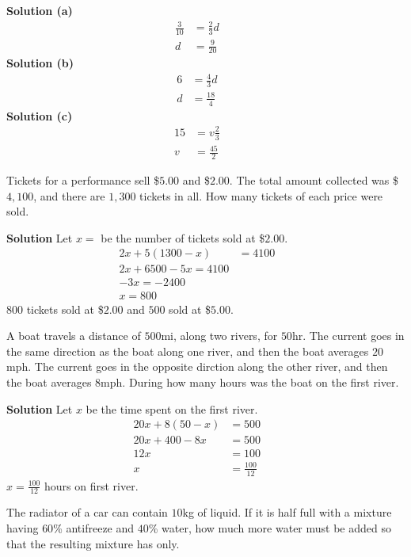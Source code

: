 \documentclass[6pt]{article}
\begin{document}
\textbf{Solution (a)}
\begin{align*}
\frac{3}{10} &= \frac{2}{3} d && \\
d &= \frac{9}{20}
\end{align*}
\textbf{Solution (b)}
\begin{align*}
6 &= \frac{4}{3} d && \\
d &= \frac{18}{4}
\end{align*}
\textbf{Solution (c)}
\begin{align*}
15 &= v \frac{2}{3} && \\
v &= \frac{45}{2} &&
\end{align*}

\begin{tcolorbox}[title=Problem 13, breakable]
Tickets for a performance sell \$$5.00$ and \$$2.00$. The total amount collected was
\$$4,100$, and there are $1,300$ tickets in all. How many tickets of each price 
were sold.
\end{tcolorbox}

\textbf{Solution}
Let $x =$ be the number of tickets sold at \$$2.00$.
\begin{align*}
2x + 5(1300 - x) &= 4100 && \\
2x + 6500 - 5x = 4100 && \\
-3x = -2400 && \\
x = 800
\end{align*}
$800$ tickets sold at \$$2.00$ and $500$ sold at \$$5.00$.

\begin{tcolorbox}[title=Problem 16, breakable]
A boat travels a distance of $500$mi, along two rivers, for $50$hr. The current goes in 
the same direction as the boat along one river, and then the boat averages $20$mph. The 
current goes in the opposite dirction along the other river, and then the boat averages 
$8$mph. During how many hours was the boat on the first river.
\end{tcolorbox}

\textbf{Solution}
Let $x$ be the time spent on the first river.
\begin{align*}
20x + 8(50 - x) &= 500 && \\
20x + 400 - 8x &= 500 && \\
12x &= 100 && \\
x &= \frac{100}{12} 
\end{align*}
$x = \frac{100}{12}$ hours on first river.

\begin{tcolorbox}[title=Problem 18, breakable]
The radiator of a car can contain $10$kg of liquid. If it is half full with a mixture 
having $60$\%  antifreeze and $40$\% water, how much more water must be added so that the
resulting mixture has only.
\end{tcolorbox}
\end{document}
